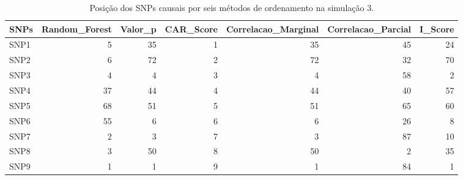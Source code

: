 \begin{table}[ht]
\centering
\begin{tabular}{lrrrrrr}
  \hline
SNPs & Random\_Forest & Valor\_p & CAR\_Score & Correlacao\_Marginal & Correlacao\_Parcial & I\_Score \\ 
  \hline
SNP1 &   5 &  35 &   1 &  35 &  45 &  24 \\ 
  SNP2 &   6 &  72 &   2 &  72 &  32 &  70 \\ 
  SNP3 &   4 &   4 &   3 &   4 &  58 &   2 \\ 
  SNP4 &  37 &  44 &   4 &  44 &  40 &  57 \\ 
  SNP5 &  68 &  51 &   5 &  51 &  65 &  60 \\ 
  SNP6 &  55 &   6 &   6 &   6 &  26 &   8 \\ 
  SNP7 &   2 &   3 &   7 &   3 &  87 &  10 \\ 
  SNP8 &   3 &  50 &   8 &  50 &   2 &  35 \\ 
  SNP9 &   1 &   1 &   9 &   1 &  84 &   1 \\ 
   \hline
\end{tabular}
\caption{Posição dos SNPs causais por seis métodos de ordenamento na simulação 3.} 
\label{tab:positions_causais}
\end{table}
